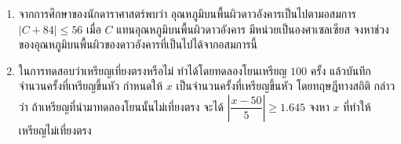 \begin{enumerate}[label=\arabic*., leftmargin=*]
\begin{multicols}{2}
\begin{enumerate}[label=\theenumi\arabic*), leftmargin=*]
		\item $|5x - 1| < -3$
		\item $|2 - x| > -3$
		\item $|x^2 - x - 1| < 5$
		\item $|x| < 2x$
		\item $|x| \leqslant 1 + 2x$
		\item $|x + 1| > 2x - 3$
		\item $|x - 1| \geqslant x$
		\item $|2x - 3| \leqslant x + 2$
		\item $|x - 2| > 1 - 3x$
		\item $|4x + 5| < -x$
		\item $x + 1 < |2x + 4|$
		\item $|2x - 4| > x + 1$
		\item $|x - 4| \leq 2x + 1$
		\item $|2x - 3| < 3x - 7$
		\item $\left|x^2 - 4\right| \leq \left|x^2 - 2x\right|$
		\item $\left|2x^2 - 5x - 1\right| \leq \left|x^2 - x + 4\right|$
		\item $2\left|\dfrac{x - 1}{x - 5}\right| \leq \left|\dfrac{x - 5}{x - 4}\right|$
		\item $\dfrac{1}{|x| - 2} \geq \dfrac{2}{|x| + 1}$
		\item $\dfrac{|x| + 6}{x + 2} + 1 < \dfrac{|x|}{x - 3}$
		\item $\left|\dfrac{x - 3}{x}\right| \geq \dfrac{x + 5}{x + 2}$
	\end{enumerate}
\end{multicols}

	\item จากการศึกษาของนักดาราศาสตร์พบว่า อุณหภูมิบนพื้นผิวดาวอังคารเป็นไปตามอสมการ $\left|C+84\right| \leq 56$ เมื่อ $C$ แทนอุณหภูมิบนพื้นผิวดาวอังคาร มีหน่วยเป็นองศาเซลเซียส จงหาช่วงของอุณหภูมิบนพื้นผิวของดาวอังคารที่เป็นไปได้จากอสมการนี้
	
	\item ในการทดสอบว่าเหรียญเที่ยงตรงหรือไม่ ทำได้โดยทดลองโยนเหรียญ $100$ ครั้ง แล้วบันทึก จำนวนครั้งที่เหรียญขึ้นหัว กำหนดให้ $x$ เป็นจำนวนครั้งที่เหรียญขึ้นหัว โดยทฤษฎีทางสถิติ กล่าวว่า ถ้าเหรียญที่นำมาทดลองโยนนั้นไม่เที่ยงตรง จะได้ $\left|\dfrac{x-50}{5}\right| \geq 1.645$ จงหา $x$ ที่ทำให้เหรียญไม่เที่ยงตรง
\end{enumerate}


